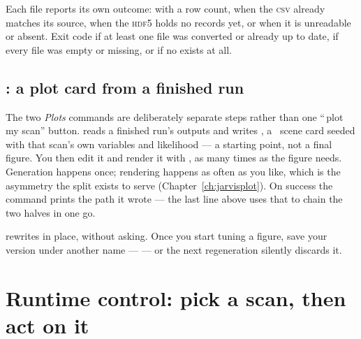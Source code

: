 Each file reports its own outcome:  with a row count,
 when the \textsc{csv} already matches its source, 
when the \textsc{hdf5} holds no records yet, or  when it is unreadable or
absent. Exit code  if at least one file was converted or already up to date,
 if every file was empty or missing, or if no  exists at all.

\subsection{: a plot card from a finished run}
\label{sec:cli-gen-plot-yaml}

\begin{terminal}
\end{terminal}

The two \emph{Plots} commands are deliberately separate steps rather than one
``\,plot my scan'' button.  reads a finished run's outputs and writes
, a \JPlot\ scene card seeded with that scan's own variables
and likelihood --- a starting point, not a final figure. You then edit it and render it
with , as many times as the figure needs. Generation happens once; rendering
happens as often as you like, which is the asymmetry the split exists to serve
(Chapter~\ref{ch:jarvisplot}). On success the command prints the path it wrote --- the
last line above uses that to chain the two halves in one go.

\begin{jwarn}
 rewrites  in place, without asking. Once you start
tuning a figure, save your version under another name ---  --- or
the next regeneration silently discards it.
\end{jwarn}

\section{Runtime control: pick a scan, then act on it}
\label{sec:cli-ps-kill}

